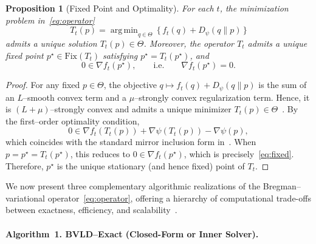\documentclass[11pt]{article}
\DeclareMathOperator*{\argmin}{arg\,min}
\theoremstyle{plain}
\newtheorem{proposition}[theorem]{Proposition}
\theoremstyle{definition}
\theoremstyle{remark}
\begin{document}
\begin{proposition}[Fixed Point and Optimality]
\label{prop:fixed-point}
For each $t$, the minimization problem in~\eqref{eq:operator}
\[
T_t(p)=\argmin_{q\in\Theta}\,\{\,f_t(q)+D_\psi(q\|p)\,\}
\]
admits a unique solution $T_t(p)\in\Theta$.
Moreover, the operator $T_t$ admits a unique fixed point 
$p^\star\in\mathrm{Fix}(T_t)$ satisfying $p^\star=T_t(p^\star)$, and
\begin{equation}
0\in\nabla f_t(p^\star),
\qquad\text{i.e.}\qquad 
\nabla f_t(p^\star)=0.
\label{eq:fixed}
\end{equation}
\end{proposition}

\begin{proof}
For any fixed $p\in\Theta$, the objective 
$q\mapsto f_t(q)+D_\psi(q\|p)$ 
is the sum of an $L$--smooth convex term and a 
$\mu$--strongly convex regularization term.
Hence, it is $(L+\mu)$--strongly convex and admits a unique minimizer 
$T_t(p)\in\Theta$~\cite{Nesterov2018,Beck2017}.
By the first--order optimality condition,
\[
0\in\nabla f_t(T_t(p))+\nabla\psi(T_t(p))-\nabla\psi(p),
\]
which coincides with the standard mirror inclusion form 
in~\cite{Nemirovski1983,Tseng2008}.
When $p=p^\star=T_t(p^\star)$, this reduces to
$0\in\nabla f_t(p^\star)$,
which is precisely~\eqref{eq:fixed}.
Therefore, $p^\star$ is the unique stationary (and hence fixed) point of $T_t$.
\end{proof}



We now present three complementary algorithmic realizations of 
the Bregman--variational operator~\eqref{eq:operator}, 
offering a hierarchy of computational trade-offs between 
exactness, efficiency, and scalability~\cite{Bolte2018,Lu2021,Hsieh2023}.

\paragraph{Algorithm~1. BVLD--Exact (Closed-Form or Inner Solver).}
\end{document}
